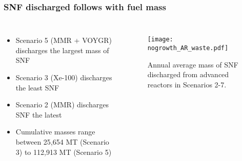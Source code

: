 \begin{frame}
    \frametitle{\gls{SNF} discharged follows with fuel mass}
    \begin{columns}
        \column[t]{4.3cm}
            \begin{itemize}
                \item Scenario 5 (MMR + VOYGR) discharges the largest mass of \gls{SNF}
                \item Scenario 3 (Xe-100) discharges the least \gls{SNF}
                \item Scenario 2 (MMR) discharges \gls{SNF} the latest
                \item Cumulative masses range between 25,654 MT (Scenario 3) to 
                      112,913 MT (Scenario 5)
                
            \end{itemize}
        \column[t]{5.7cm}
        \vspace{-1cm}
        \begin{figure}
                \centering
                \texttt{[image: nogrowth\_AR\_waste.pdf]}
                \caption{Annual average mass of \gls{SNF} discharged from 
                advanced reactors in Scenarios 2-7.}
                \label{fig:waste}
        \end{figure}
    \end{columns}
\end{frame}
